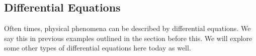 \subsection*{Differential Equations}
Often times, physical phenomena can be described by differential equations. We say this in previous examples outlined in the section before this. We will explore some other types of differential equations here today as well.

\vspace{.25in}

